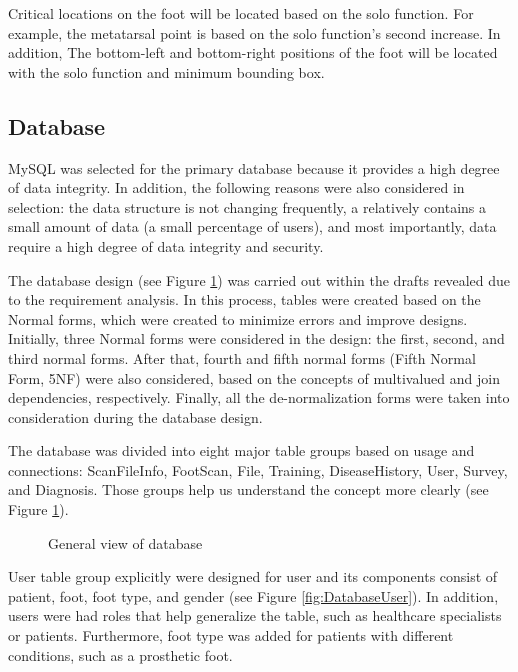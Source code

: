 Critical locations on the foot will be located based on the solo function. For example, the metatarsal point is based on the solo function's second increase. In addition, The bottom-left and bottom-right positions of the foot will be located with the solo function and minimum bounding box.

\subsection{Database} \label{sec:StudyIDatabase}

MySQL was selected for the primary database because it provides a high degree of data integrity. In addition, the following reasons were also considered in selection: the data structure is not changing frequently, a relatively contains a small amount of data (a small percentage of users), and most importantly, data require a high degree of data integrity and security.

The database design (see Figure \ref{fig:DatabaseGeneralView}) was carried out within the drafts revealed due to the requirement analysis. In this process, tables were created based on the Normal forms, which were created to minimize errors and improve designs. Initially, three Normal forms were considered in the design: the first, second, and third normal forms. After that, fourth and fifth normal forms (Fifth Normal Form, 5NF) were also considered, based on the concepts of multivalued and join dependencies, respectively. Finally, all the de-normalization forms were taken into consideration during the database design.

The database was divided into eight major table groups based on usage and connections: ScanFileInfo, FootScan, File, Training, DiseaseHistory, User, Survey, and Diagnosis. Those groups help us understand the concept more clearly (see Figure \ref{fig:DatabaseGeneralView}). 

\begin{figure}[htbp]
\centering
{}
\caption{General view of database}
\label{fig:DatabaseGeneralView}
\end{figure}

User table group explicitly were designed for user and its components consist of patient, foot, foot type, and gender (see Figure \ref{fig:DatabaseUser}). In addition, users were had roles that help generalize the table, such as healthcare specialists or patients. Furthermore, foot type was added for patients with different conditions, such as a prosthetic foot.

